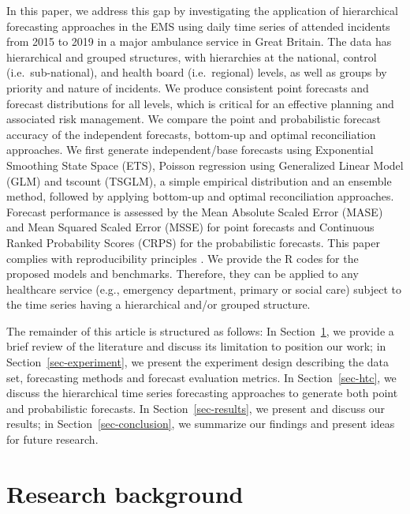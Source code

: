 \documentclass[
  authoryear,
  preprint,
  3p]{elsarticle}
\begin{document}
In this paper, we address this gap by investigating the application of
hierarchical forecasting approaches in the EMS using daily time series
of attended incidents from 2015 to 2019 in a major ambulance service in
Great Britain. The data has hierarchical and grouped structures, with
hierarchies at the national, control (i.e.~sub-national), and health
board (i.e.~regional) levels, as well as groups by priority and nature
of incidents. We produce consistent point forecasts and forecast
distributions for all levels, which is critical for an effective
planning and associated risk management. We compare the point and
probabilistic forecast accuracy of the independent forecasts, bottom-up
and optimal reconciliation approaches. We first generate
independent/base forecasts using Exponential Smoothing State Space
(ETS), Poisson regression using Generalized Linear Model (GLM) and
tscount (TSGLM), a simple empirical distribution and an ensemble method,
followed by applying bottom-up and optimal reconciliation approaches.
Forecast performance is assessed by the Mean Absolute Scaled Error
(MASE) and Mean Squared Scaled Error (MSSE) for point forecasts and
Continuous Ranked Probability Scores (CRPS) for the probabilistic
forecasts. This paper complies with reproducibility principles
\citep{stodden2013best, boylan2015reproducibility}. We provide the R
codes for the proposed models and benchmarks. Therefore, they can be
applied to any healthcare service (e.g., emergency department, primary
or social care) subject to the time series having a hierarchical and/or
grouped structure.

The remainder of this article is structured as follows: In
Section~\ref{sec-lit}, we provide a brief review of the literature and
discuss its limitation to position our work; in
Section~\ref{sec-experiment}, we present the experiment design
describing the data set, forecasting methods and forecast evaluation
metrics. In Section~\ref{sec-htc}, we discuss the hierarchical time
series forecasting approaches to generate both point and probabilistic
forecasts. In Section~\ref{sec-results}, we present and discuss our
results; in Section~\ref{sec-conclusion}, we summarize our findings and
present ideas for future research.

\hypertarget{sec-lit}{%
\section{Research background}\label{sec-lit}}
\end{document}
